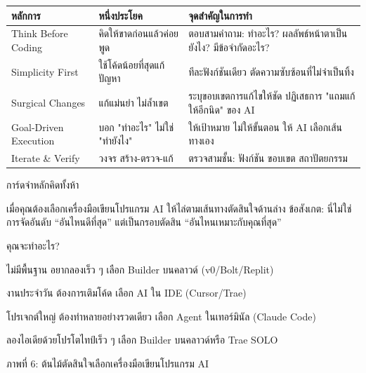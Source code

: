 


\begin{center}
\begin{tabularx}{\linewidth}{|X|X|X|}
\hline
\textbf{หลักการ} & \textbf{หนึ่งประโยค} & \textbf{จุดสำคัญในการทำ} \tabularnewline
\hline
Think Before Coding & คิดให้ขาดก่อนแล้วค่อยพูด & ตอบสามคำถาม: ทำอะไร? ผลลัพธ์หน้าตาเป็นยังไง? มีข้อจำกัดอะไร? \tabularnewline
Simplicity First & ใช้โค้ดน้อยที่สุดแก้ปัญหา & ทีละฟังก์ชันเดียว ตัดความซับซ้อนที่ไม่จำเป็นทิ้ง \tabularnewline
Surgical Changes & แก้แม่นยำ ไม่ล้ำเขต & ระบุขอบเขตการแก้ไขให้ชัด ปฏิเสธการ "แถมแก้ให้อีกนิด" ของ AI \tabularnewline
Goal-Driven Execution & บอก "ทำอะไร" ไม่ใช่ "ทำยังไง" & ให้เป้าหมาย ไม่ให้ขั้นตอน ให้ AI เลือกเส้นทางเอง \tabularnewline
Iterate \& Verify & วงจร สร้าง-ตรวจ-แก้ & ตรวจสามชั้น: ฟังก์ชัน ขอบเขต สถาปัตยกรรม \tabularnewline
\hline
\end{tabularx}
\end{center}

\begin{center}\small\color{gray}การ์ดจำหลักคิดทั้งห้า\end{center}


เมื่อคุณต้องเลือกเครื่องมือเขียนโปรแกรม AI ให้ไล่ตามเส้นทางตัดสินใจด้านล่าง ข้อสังเกต: นี่ไม่ใช่การจัดอันดับ “อันไหนดีที่สุด” แต่เป็นกรอบตัดสิน “อันไหนเหมาะกับคุณที่สุด”

คุณจะทำอะไร?

ไม่มีพื้นฐาน อยากลองเร็ว ๆ เลือก Builder บนคลาวด์ (v0/Bolt/Replit)

งานประจำวัน ต้องการเติมโค้ด เลือก AI ใน IDE (Cursor/Trae)

โปรเจกต์ใหญ่ ต้องทำหลายอย่างรวดเดียว เลือก Agent ในเทอร์มินัล (Claude Code)

ลองไอเดียด้วยโปรโตไทป์เร็ว ๆ เลือก Builder บนคลาวด์หรือ Trae SOLO

\begin{center}\small\color{gray}ภาพที่ 6: ต้นไม้ตัดสินใจเลือกเครื่องมือเขียนโปรแกรม AI\end{center}

